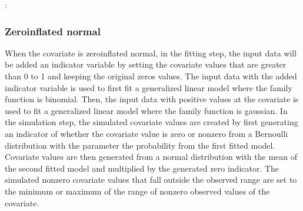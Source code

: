 \documentclass[letterpaper,10pt,english]{sphinxmanual}
\begin{document}
\begin{sphinxVerbatim}[commandchars=\\\{\}]
        
         
      \PYG{p}{[} \PYG{p}{]}
      \PYG{p}{[} \PYG{p}{]}
       
      
\end{sphinxVerbatim}

\sphinxAtStartPar
{}:
\begin{quote}

\end{quote}


\subsubsection{Zero\sphinxhyphen{}inflated normal}
\label{\detokenize{Specifications/Covariate model:zero-inflated-normal}}
\sphinxAtStartPar
When the covariate is zero\sphinxhyphen{}inflated normal, in the fitting step, the input data will be added an indicator variable
by setting the covariate values that are greater than 0 to 1 and keeping the original zeros values.
The input data with the added indicator variable is used to first fit a generalized linear model where
the family function is binomial. Then, the input data with positive values at the covariate is used to
fit a generalized linear model where the family function is gaussian. In the simulation step,
the simulated covariate values are created by first generating an indicator of whether the covariate value is zero
or non\sphinxhyphen{}zero from a Bernoulli distribution with the parameter the probability from the first fitted model. Covariate
values are then generated from a normal distribution with the mean of the second fitted model
and multiplied by the generated zero indicator. The simulated non\sphinxhyphen{}zero covariate values that fall outside
the observed range are set to the minimum or maximum of the range of non\sphinxhyphen{}zero observed values
of the covariate.
\end{document}
